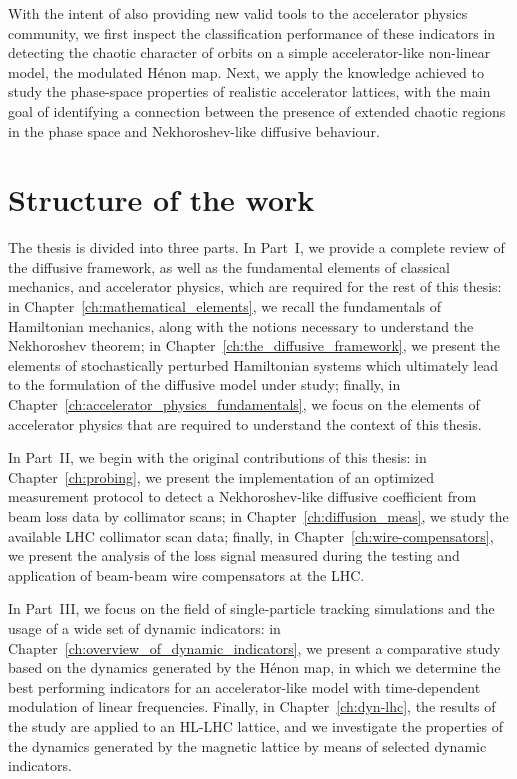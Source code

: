 With the intent of also providing new valid tools to the accelerator physics community, we first inspect the classification performance of these indicators in detecting the chaotic character of orbits on a simple accelerator-like non-linear model, the modulated Hénon map. Next, we apply the knowledge achieved to study the phase-space properties of realistic accelerator lattices, with the main goal of identifying a connection between the presence of extended chaotic regions in the phase space and Nekhoroshev-like diffusive behaviour.

\section*{Structure of the work}

The thesis is divided into three parts. In Part~I, we provide a complete review of the diffusive framework, as well as the fundamental elements of classical mechanics, and accelerator physics, which are required for the rest of this thesis: in Chapter~\ref{ch:mathematical_elements}, we recall the fundamentals of Hamiltonian mechanics, along with the notions necessary to understand the Nekhoroshev theorem; in Chapter~\ref{ch:the_diffusive_framework}, we present the elements of stochastically perturbed Hamiltonian systems which ultimately lead to the formulation of the diffusive model under study; finally, in Chapter~\ref{ch:accelerator_physics_fundamentals}, we focus on the elements of accelerator physics that are required to understand the context of this thesis.

In Part~II, we begin with the original contributions of this thesis: in Chapter~\ref{ch:probing}, we present the implementation of an optimized measurement protocol to detect a Nekhoroshev-like diffusive coefficient from beam loss data by collimator scans; in Chapter~\ref{ch:diffusion_meas}, we study the available LHC collimator scan data; finally, in Chapter~\ref{ch:wire-compensators}, we present the analysis of the loss signal measured during the testing and application of beam-beam wire compensators at the LHC.

In Part~III, we focus on the field of single-particle tracking simulations and the usage of a wide set of dynamic indicators: in Chapter~\ref{ch:overview_of_dynamic_indicators}, we present a comparative study based on the dynamics generated by the Hénon map, in which we determine the best performing indicators for an accelerator-like model with time-dependent modulation of linear frequencies. Finally, in Chapter~\ref{ch:dyn-lhc}, the results of the study are applied to an HL-LHC lattice, and we investigate the properties of the dynamics generated by the magnetic lattice by means of selected dynamic indicators.


